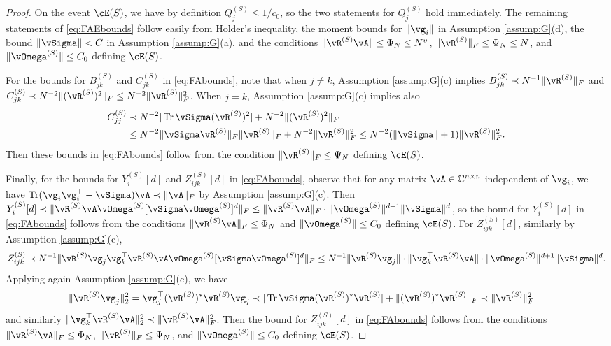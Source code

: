 \begin{proof}
On the event $\cE(S)$, we have by definition $Q_j^{(S)} \leq 1/c_0$, so the
two statements for $Q_j^{(S)}$ hold immediately. The remaining statements of
\eqref{eq:FAEbounds} follow easily from Holder's inequality, the moment bounds
for $\|\vg_i\|$ in Assumption \ref{assump:G}(d),
the bound $\|\vSigma\|<C$ in Assumption \ref{assump:G}(a),
and the conditions $\|\vR^{(S)}\vA\| \leq \Phi_N \leq N^\upsilon$,
$\|\vR^{(S)}\|_F \leq \Psi_N \leq N$, and $\|\vOmega^{(S)}\| \leq C_0$
defining $\cE(S)$.

For the bounds for $B_{jk}^{(S)}$ and $C_{jk}^{(S)}$ in \eqref{eq:FAbounds},
note that when $j \neq k$, Assumption \ref{assump:G}(c) implies $B_{jk}^{(S)}
\prec N^{-1}\|\vR^{(S)}\|_F$ and $C_{jk}^{(S)} \prec N^{-2}\|(\vR^{(S)})^2\|_F
\leq N^{-2}\|\vR^{(S)}\|_F^2$.
When $j=k$, Assumption \ref{assump:G}(c) implies also
\begin{align*}
C_{jj}^{(S)} &\prec N^{-2}|\Tr \vSigma(\vR^{(S)})^2|+N^{-2}\|(\vR^{(S)})^2\|_F\\
&\leq N^{-2}\|\vSigma \vR^{(S)}\|_F \|\vR^{(S)}\|_F+N^{-2}\|\vR^{(S)}\|_F^2
\leq N^{-2}(\|\vSigma\|+1)\|\vR^{(S)}\|_F^2.
\end{align*}
Then these bounds in \eqref{eq:FAbounds} follow from the condition
$\|\vR^{(S)}\|_F \leq \Psi_N$ defining $\cE(S)$.

Finally, for the bounds for $Y_i^{(S)}[d]$ and $Z_{ijk}^{(S)}[d]$ in
\eqref{eq:FAbounds}, observe that for any matrix $\vA \in \C^{n \times n}$ 
independent of $\vg_i$, we have
$\Tr(\vg_i\vg_i^\top-\vSigma)\vA \prec \|\vA\|_F$
by Assumption \ref{assump:G}(c). Then
$Y_i^{(S)}[d] \prec \|\vR^{(S)}\vA \vOmega^{(S)}[\vSigma\vOmega^{(S)}]^d\|_F
\leq \|\vR^{(S)}\vA\|_F \cdot
\|\vOmega^{(S)}\|^{d+1}\|\vSigma\|^d$, so the bound for $Y_i^{(S)}[d]$ in
\eqref{eq:FAbounds} follows
from the conditions $\|\vR^{(S)}\vA\|_F \leq \Phi_N$ and $\|\vOmega^{(S)}\| \leq
C_0$ defining $\cE(S)$.
For $Z_{ijk}^{(S)}[d]$, similarly by Assumption \ref{assump:G}(c),
\[Z_{ijk}^{(S)} \prec N^{-1}\|\vR^{(S)}\vg_j\vg_k^\top
\vR^{(S)}\vA \vOmega^{(S)}[\vSigma\vOmega^{(S)}]^d\|_F
\leq N^{-1}\|\vR^{(S)}\vg_j\| \cdot \|\vg_k^\top
\vR^{(S)}\vA\| \cdot \|\vOmega^{(S)}\|^{d+1}\|\vSigma\|^d.\]
Applying again Assumption \ref{assump:G}(c), we have
\begin{align*}
\|\vR^{(S)}\vg_j\|_2^2
&=\vg_j^\top (\vR^{(S)})^*\vR^{(S)}\vg_j
\prec |\Tr \vSigma(\vR^{(S)})^*\vR^{(S)}|
+\|(\vR^{(S)})^*\vR^{(S)}\|_F \prec \|\vR^{(S)}\|_F^2
\end{align*}
and similarly $\|\vg_k^\top \vR^{(S)}\vA\|_2^2 \prec \|\vR^{(S)}\vA\|_F^2$.
Then the bound for $Z_{ijk}^{(S)}[d]$ in \eqref{eq:FAbounds}
follows from the conditions
$\|\vR^{(S)}\vA\|_F \leq \Phi_N$, $\|\vR^{(S)}\|_F \leq \Psi_N$,
and $\|\vOmega^{(S)}\| \leq C_0$ defining $\cE(S)$.
\end{proof}

